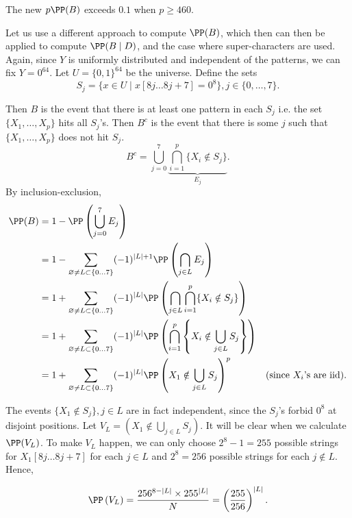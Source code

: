 The new $p\PP(B)$ exceeds $0.1$ when $p\ge 460$.

Let us use a different approach to compute $\PP(B)$, which then can then be applied to compute $\PP(B\mid D)$, and the case where super-characters are used. Again, since $Y$ is uniformly distributed and independent of the patterns, we can fix $Y=0^{64}$. Let $U=\{0,1\}^{64}$ be the universe. Define the sets
$$S_j=\{x\in U \mid x[8j\ldots 8j+7] = 0^8\}, j\in\{0,\ldots, 7\}.$$

Then $B$ is the event that there is at least one pattern in each $S_j$ i.e. the set $\{X_1,\ldots,X_p\}$ hits all $S_j$'s. Then $B^c$ is the event that there is some $j$ such that $\{X_1,\ldots,X_p\}$ does not hit $S_j$.
$$B^c = \bigcup_{j=0}^7 \underbrace{\bigcap_{i=1}^p \{X_i\notin S_j\}}_{E_j}.$$
By inclusion-exclusion,
\begin{align*}
  \PP(B)
   & = 1-\PP\left(\bigcup_{j=0}^7 E_j\right)                                                                                                                                         \\
   & = 1-\sum_{\varnothing\ne L \subset \{0\ldots 7\}} (-1)^{|L|+1}\PP\left(\bigcap_{j\in L} E_j\right)                                                                              \\
   & = 1+\sum_{\varnothing\ne L \subset \{0\ldots 7\}} (-1)^{|L|}\PP\left(\bigcap_{j\in L}\bigcap_{i=1}^p \{X_i\notin S_j\}\right)                                                   \\
   & = 1+\sum_{\varnothing\ne L \subset \{0\ldots 7\}} (-1)^{|L|}\PP\left(\bigcap_{i=1}^p \left\{X_i\notin \bigcup_{j\in L}S_j\right\}\right)                                        \\
   & = 1+\sum_{\varnothing\ne L \subset \{0\ldots 7\}} (-1)^{|L|}\PP\left(X_1\notin \bigcup_{j\in L} S_j\right)^p                             & (\text{since }X_i\text{'s are iid}).
\end{align*}

The events $\{X_1\notin S_j\}, j\in L$ are in fact independent, since the $S_j$'s forbid $0^8$ at disjoint positions. Let $V_L = (X_1\notin \bigcup_{j\in L} S_j)$. It will be clear when we calculate $\PP(V_L)$. To make $V_L$ happen, we can only choose $2^8-1=255$ possible strings for $X_1[8j\ldots 8j+7]$ for each $j\in L$ and $2^8=256$ possible strings for each $j\notin L$. Hence,

$$\PP\left(V_L\right) = \dfrac{256^{8-|L|}\times 255^{|L|}}{N} = \left(\dfrac{255}{256}\right)^{|L|}.$$

